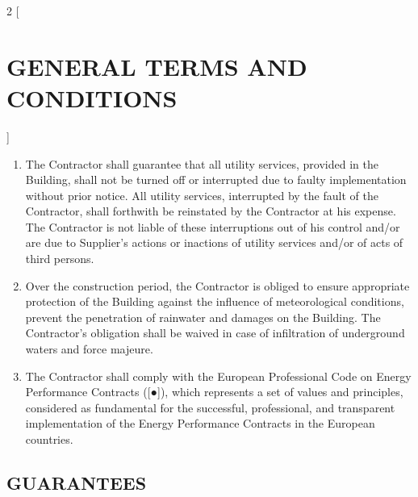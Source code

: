 \begin{multicols}{2} [\section{GENERAL TERMS AND CONDITIONS}]
\begin{enumerate}
    measures.
  \item The Contractor shall guarantee that all utility services,
    provided in the Building, shall not be turned off or interrupted
    due to faulty implementation without prior notice. All utility
    services, interrupted by the fault of the Contractor, shall
    forthwith be reinstated by the Contractor at his expense. The
    Contractor is not liable of these interruptions out of his control
    and/or are due to Supplier’s actions or inactions of utility
    services and/or of acts of third persons.
  \item Over the construction period, the Contractor is obliged to
    ensure appropriate protection of the Building against the
    influence of meteorological conditions, prevent the penetration of
    rainwater and damages on the Building. The Contractor’s obligation
    shall be waived in case of infiltration of underground waters and
    force majeure.
  \item The Contractor shall comply with the European Professional
    Code on Energy Performance Contracts ([●]), which represents a set
    of values and principles, considered as fundamental for the
    successful, professional, and transparent implementation of the
    Energy Performance Contracts in the European countries.
  \end{enumerate}

  \subsection{GUARANTEES}
  \begin{enumerate}


\end{enumerate}
\end{multicols}
